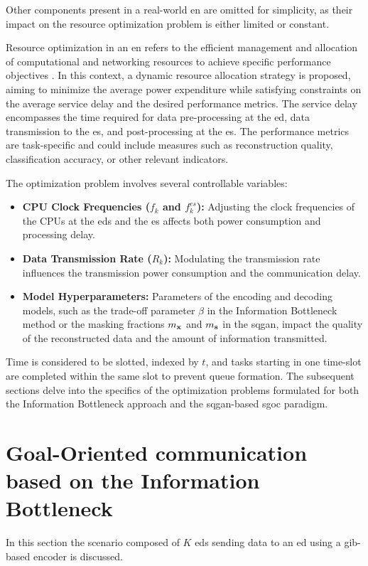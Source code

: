 Other components present in a real-world \gls{en} are omitted for simplicity, as their impact on the resource optimization problem is either limited or constant.

Resource optimization in an \gls{en} refers to the efficient management and allocation of computational and networking resources to achieve specific performance objectives \cite{Mach2017mobile, Huang2019multi, Mach2017mobile, Binucci2023goaloriented}. In this context, a dynamic resource allocation strategy is proposed, aiming to minimize the average power expenditure while satisfying constraints on the average service delay and the desired performance metrics. The service delay encompasses the time required for data pre-processing at the \gls{ed}, data transmission to the \gls{es}, and post-processing at the \gls{es}. The performance metrics are task-specific and could include measures such as reconstruction quality, classification accuracy, or other relevant indicators.

The optimization problem involves several controllable variables:

\begin{itemize} \item \textbf{CPU Clock Frequencies ($f_k$ and $f_k^{es}$):} Adjusting the clock frequencies of the CPUs at the \glspl{ed} and the \gls{es} affects both power consumption and processing delay. \item \textbf{Data Transmission Rate ($R_k$):} Modulating the transmission rate influences the transmission power consumption and the communication delay. \item \textbf{Model Hyperparameters:} Parameters of the encoding and decoding models, such as the trade-off parameter $\beta$ in the Information Bottleneck method or the masking fractions $m_{\mathbf{x}}$ and $m_{\mathbf{s}}$ in the \gls{sqgan}, impact the quality of the reconstructed data and the amount of information transmitted. \end{itemize}

Time is considered to be slotted, indexed by $t$, and tasks starting in one time-slot are completed within the same slot to prevent queue formation. The subsequent sections delve into the specifics of the optimization problems formulated for both the Information Bottleneck approach and the \gls{sqgan}-based \gls{sgoc} paradigm.

\section{Goal-Oriented communication based on the Information Bottleneck}\label{sec: EN_ib}
In this section the scenario composed of $K$ \glspl{ed} sending data to an \gls{ed} using a \gls{gib}-based encoder is discussed.

